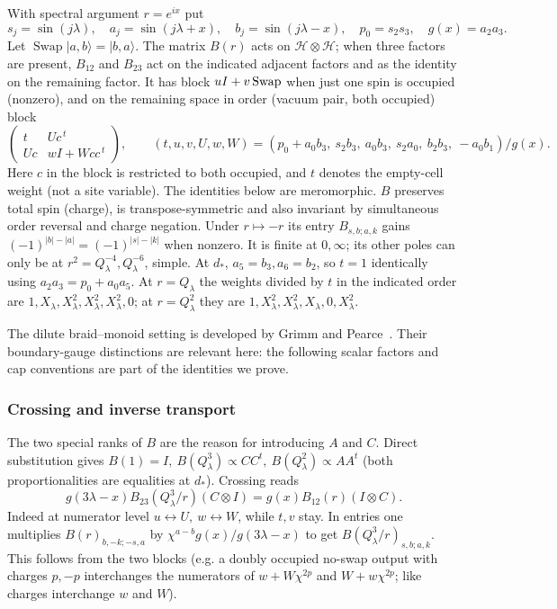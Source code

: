 With spectral argument \(r=e^{ix}\) put
\[
 s_j=\sin(j\lambda),\quad a_j=\sin(j\lambda+x),\quad b_j=\sin(j\lambda-x),
 \quad p_0=s_2 s_3,\quad g(x)=a_2 a_3.
\]
Let $\operatorname{Swap}|a,b\rangle=|b,a\rangle$. The matrix
$B(r)$ acts on $\mathcal H\otimes\mathcal H$; when three factors are
present, $B_{12}$ and $B_{23}$ act on the indicated adjacent factors and
as the identity on the remaining factor. It has block \(uI+v\,{\rm Swap}\) when just one spin is occupied (nonzero), and on the remaining space in order (vacuum pair, both occupied) block
\[
 \begin{pmatrix} t & Uc^{\,t}\\ Uc & w I+W c c^{\,t}\end{pmatrix},
 \qquad
 (t,u,v,U,w,W)=(p_0+a_0 b_3,\ s_2 b_3,\ a_0 b_3,\ s_2 a_0,\ b_2 b_3,\ -a_0 b_1)/g(x).
\]
Here \(c\) in the block is restricted to both occupied, and \(t\) denotes the empty-cell weight (not a site variable). The identities below are meromorphic. \(B\) preserves total spin (charge), is transpose-symmetric and also invariant by simultaneous order reversal and charge negation. Under \(r\mapsto-r\) its entry \(B_{s,b;a,k}\) gains \((-1)^{|b|-|a|}=(-1)^{|s|-|k|}\) when nonzero. It is finite at \(0,\infty\); its other poles can only be at \(r^2=Q_\lambda^{-4},Q_\lambda^{-6}\), simple. At \(d_*\), \(a_5=b_3,a_6=b_2\), so \(t=1\) identically using \(a_2a_3=p_0+a_0a_5\). At \(r=Q_\lambda\) the weights divided by \(t\) in the indicated order are \(1,X_\lambda,X_\lambda^2,X_\lambda^2,X_\lambda^2,0\); at \(r=Q_\lambda^2\) they are \(1,X_\lambda^2,X_\lambda^2,X_\lambda,0,X_\lambda^2\). \cite{GlazmanManolescu2017,ZhouBatchelor1997}

The dilute braid--monoid setting is developed by Grimm and Pearce~\cite{GrimmPearce1993}. Their boundary-gauge distinctions are relevant here: the following scalar factors and cap conventions are part of the identities we prove.

\subsubsection{Crossing and inverse transport}

The two special ranks of $B$ are the reason for introducing $A$ and $C$.
Direct substitution gives \(B(1)=I,\ B(Q_\lambda^3)\propto C C^t,\ B(Q_\lambda^2)\propto A A^t\) (both proportionalities are equalities at \(d_*\)). Crossing reads
\[
 g(3\lambda-x)B_{23}(Q_\lambda^3/r)(C\otimes I)
   =g(x) B_{12}(r)(I\otimes C).
\]
Indeed at numerator level \(u\leftrightarrow U,\ w\leftrightarrow W\), while \(t,v\) stay. In entries one multiplies \(B(r)_{b,-k;-s,a}\) by \(\chi^{a-b}g(x)/g(3\lambda-x)\) to get \(B(Q_\lambda^3/r)_{s,b;a,k}\). This follows from the two blocks (e.g. a doubly occupied no-swap output with charges \(p,-p\) interchanges the numerators of \(w+W\chi^{2p}\) and \(W+w\chi^{2p}\); like charges interchange \(w\) and \(W\)).

